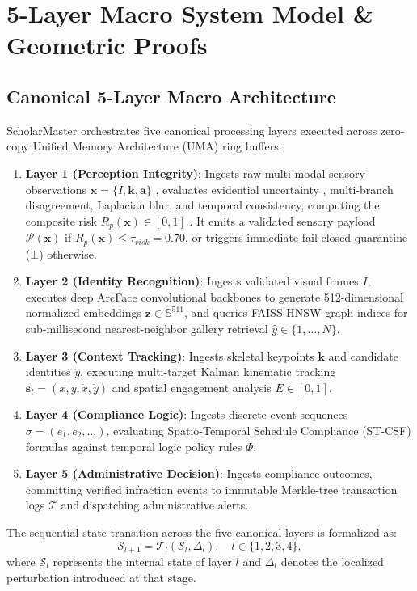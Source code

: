 \documentclass[conference]{IEEEtran}
\begin{document}
\section{5-Layer Macro System Model \& Geometric Proofs}
\subsection{Canonical 5-Layer Macro Architecture}
ScholarMaster orchestrates five canonical processing layers executed across zero-copy Unified Memory Architecture (UMA) ring buffers:
\begin{enumerate}
    \item \textbf{Layer 1 (Perception Integrity)}: Ingests raw multi-modal sensory observations $\mathbf{x} = \{I, \mathbf{k}, \mathbf{a}\}$ \cite{khaleghi2013multisensor}, evaluates evidential uncertainty \cite{guo2017calibration}, multi-branch disagreement, Laplacian blur, and temporal consistency, computing the composite risk $R_p(\mathbf{x}) \in [0, 1]$ \cite{kumar2026scholar22}. It emits a validated sensory payload $\mathcal{P}(\mathbf{x})$ if $R_p(\mathbf{x}) \le \tau_{risk} = 0.70$, or triggers immediate fail-closed quarantine ($\bot$) otherwise.
    \item \textbf{Layer 2 (Identity Recognition)}: Ingests validated visual frames $I$, executes deep ArcFace convolutional backbones to generate 512-dimensional normalized embeddings $\mathbf{z} \in \mathbb{S}^{511}$, and queries FAISS-HNSW graph indices for sub-millisecond nearest-neighbor gallery retrieval $\hat{y} \in \{1, \dots, N\}$.
    \item \textbf{Layer 3 (Context Tracking)}: Ingests skeletal keypoints $\mathbf{k}$ and candidate identities $\hat{y}$, executing multi-target Kalman kinematic tracking $\mathbf{s}_t = (x, y, \dot{x}, \dot{y})$ and spatial engagement analysis $E \in [0, 1]$.
    \item \textbf{Layer 4 (Compliance Logic)}: Ingests discrete event sequences $\sigma = (e_1, e_2, \dots)$, evaluating Spatio-Temporal Schedule Compliance (ST-CSF) formulas against temporal logic policy rules $\Phi$.
    \item \textbf{Layer 5 (Administrative Decision)}: Ingests compliance outcomes, committing verified infraction events to immutable Merkle-tree transaction logs $\mathcal{T}$ and dispatching administrative alerts.
\end{enumerate}

The sequential state transition across the five canonical layers is formalized as:
\begin{equation}
\mathcal{S}_{l+1} = \mathcal{T}_l(\mathcal{S}_l, \Delta_l), \quad l \in \{1, 2, 3, 4\},
\end{equation}
where $\mathcal{S}_l$ represents the internal state of layer $l$ and $\Delta_l$ denotes the localized perturbation introduced at that stage.
\end{document}
